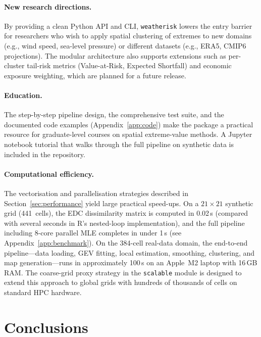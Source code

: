 \documentclass[preprint,12pt,a4paper]{elsarticle}
\begin{document}
\paragraph{New research directions.}
By providing a clean Python API and CLI, \texttt{weatherisk} lowers
the entry barrier for researchers who wish to apply spatial
clustering of extremes to new domains (e.g., wind speed, sea-level
pressure) or different datasets (e.g., ERA5, CMIP6 projections).
The modular architecture also supports extensions such as
per-cluster tail-risk metrics (Value-at-Risk, Expected Shortfall)
and economic exposure weighting, which are planned for a future
release.

\paragraph{Education.}
The step-by-step pipeline design, the comprehensive test suite,
and the documented code examples (Appendix~\ref{app:code}) make
the package a practical resource for graduate-level courses on
spatial extreme-value methods.  A Jupyter notebook tutorial
that walks through the full pipeline on synthetic data is
included in the repository.

\paragraph{Computational efficiency.}
The vectorisation and parallelisation strategies described in
Section~\ref{sec:performance} yield large practical speed-ups.
On a $21 \times 21$ synthetic grid (441~cells), the EDC
dissimilarity matrix is computed in 0.02\,s (compared with
several seconds in R's nested-loop implementation), and the
full pipeline including 8-core parallel MLE completes in under
1\,s (see Appendix~\ref{app:benchmark}).  On the 384-cell
real-data domain, the end-to-end pipeline---data loading, GEV
fitting, local estimation, smoothing, clustering, and map
generation---runs in approximately 100\,s on an Apple~M2 laptop
with 16\,GB RAM.  The coarse-grid proxy strategy in the
\texttt{scalable} module is designed to extend this approach to
global grids with hundreds of thousands of cells on standard
HPC hardware.

\section{Conclusions}
\label{sec:conclusions}
\end{document}
